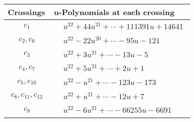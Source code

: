 \documentclass[1p]{elsarticle_modified}
\theoremstyle{definition}
\begin{document}
\begin{tabular}{m{50pt}|m{274pt}}
Crossings & \hspace{64pt}u-Polynomials at each crossing \\
\hline $$\begin{aligned}c_{1}\end{aligned}$$&$\begin{aligned}
&u^{22}+44 u^{21}+\cdots+111391 u+14641
\end{aligned}$\\
\hline $$\begin{aligned}c_{2},c_{6}\end{aligned}$$&$\begin{aligned}
&u^{22}-22 u^{20}+\cdots-95 u-121
\end{aligned}$\\
\hline $$\begin{aligned}c_{3}\end{aligned}$$&$\begin{aligned}
&u^{22}+3 u^{21}+\cdots-13 u-5
\end{aligned}$\\
\hline $$\begin{aligned}c_{4},c_{7}\end{aligned}$$&$\begin{aligned}
&u^{22}+5 u^{21}+\cdots+2 u+1
\end{aligned}$\\
\hline $$\begin{aligned}c_{5},c_{10}\end{aligned}$$&$\begin{aligned}
&u^{22}- u^{21}+\cdots-123 u-173
\end{aligned}$\\
\hline $$\begin{aligned}c_{8},c_{11},c_{12}\end{aligned}$$&$\begin{aligned}
&u^{22}+u^{21}+\cdots-12 u+7
\end{aligned}$\\
\hline $$\begin{aligned}c_{9}\end{aligned}$$&$\begin{aligned}
&u^{22}-6 u^{21}+\cdots-66255 u-6691
\end{aligned}$\\
\hline
\end{tabular}\\~\\
\newpage\renewcommand{\arraystretch}{1}
\end{document}
